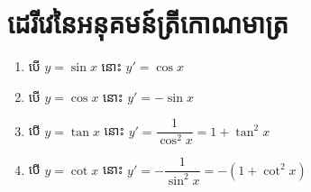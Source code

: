 \documentclass[a4paper,12pt]{article}
\begin{document}
\section{ដេរីវេនៃអនុគមន៍ត្រីកោណមាត្រ}
\begin{enumerate}
	\item បើ $y=\sin x$ នោះ $y'=\cos x$
	\item បើ $y=\cos x$ នោះ $y'=-\sin x$
	\item បើ $y=\tan x$ នោះ $y'=\dfrac{1}{\cos^2 x}=1+\tan^2 x$
	\item បើ $y=\cot x$ នោះ $y'=-\dfrac{1}{\sin^2 x}=-(1+\cot^2 x)$
\end{enumerate}
\solution
\end{document}
